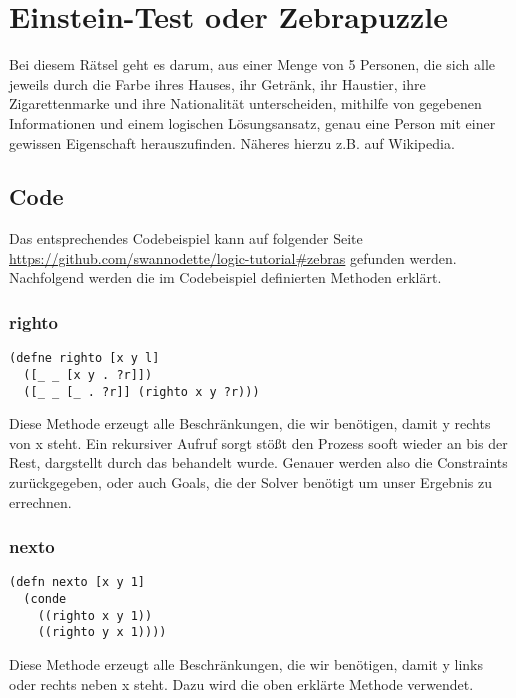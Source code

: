 \section{Einstein-Test oder Zebrapuzzle}

Bei diesem Rätsel geht es darum, aus einer Menge von 5 Personen, die sich alle jeweils durch die Farbe ihres Hauses, ihr Getränk, ihr Haustier, ihre Zigarettenmarke und ihre Nationalität unterscheiden, mithilfe von gegebenen Informationen und einem logischen Lösungsansatz, genau eine Person mit einer gewissen Eigenschaft herauszufinden. Näheres hierzu z.B. auf Wikipedia.

\subsection{Code}

Das entsprechendes Codebeispiel kann auf folgender Seite \url{https://github.com/swannodette/logic-tutorial#zebras} gefunden werden. 
Nachfolgend werden die im Codebeispiel definierten Methoden erklärt.

\subsubsection{righto}

\begin{lstlisting}
(defne righto [x y l]
  ([_ _ [x y . ?r]])
  ([_ _ [_ . ?r]] (righto x y ?r)))
\end{lstlisting}
Diese Methode erzeugt alle Beschränkungen, die wir benötigen, damit \dq{}y\dq{} rechts von \dq{}x\dq{} steht. Ein rekursiver Aufruf sorgt stößt den Prozess sooft wieder an bis der Rest, dargstellt durch das  behandelt wurde. Genauer werden also die Constraints zurückgegeben, oder auch Goals, die der Solver benötigt um unser Ergebnis zu errechnen.\\

\subsubsection{nexto}

\begin{lstlisting}
(defn nexto [x y 1]
  (conde
    ((righto x y 1))
    ((righto y x 1))))
\end{lstlisting}
Diese Methode erzeugt alle Beschränkungen, die wir benötigen, damit \dq{}y\dq{} links oder rechts neben \dq{}x\dq{} steht. Dazu wird die oben erklärte Methode  verwendet.
\\
